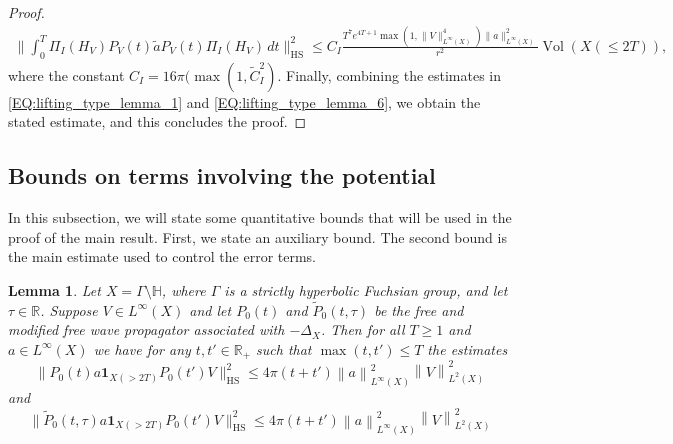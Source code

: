\documentclass[11pt,twoside,reqno]{amsart}
\newcommand{\R}{\mathbb{R}}
\newcommand{\bH}{\mathbb{H}}
\newcommand{\1}{\mathrm{\mathbf{1}}}
\newcommand{\bHS}{\mathrm{HS}}
\DeclareMathOperator{\Vol}{Vol}
\newcommand{\norm}[1]{\left\lVert#1\right\rVert}
\numberwithin{equation}{section}
\theoremstyle{plain}
\newtheorem{lemma}[thm]{Lemma}
\theoremstyle{definition}
\theoremstyle{remark}
\begin{document}
\begin{proof}
    \begin{equation}\label{EQ:lifting_type_lemma_6}
    \begin{aligned}
        \Big\lVert \int_0^T \Pi_I(H_V)P_V(t) \tilde{a} P_V(t)\Pi_I(H_V) \,  d t  \Big\rVert_{\bHS}^2 
        \leq C_I \frac{ T^7 e^{4T+1}\max(1, \lVert V\rVert_{L^\infty(X)}^4) \lVert a \rVert^2_{L^\infty(X)}}{r^2} \Vol(X(\leq2T)),
    \end{aligned} 
    \end{equation}
    where the constant $C_I = 16 \pi (\max(1,\tilde{C}_I^2)$. Finally, combining the estimates in \eqref{EQ:lifting_type_lemma_1} and \eqref{EQ:lifting_type_lemma_6}, we obtain the stated estimate, and this concludes the proof.
\end{proof}

\subsection{Bounds on terms involving the potential}

In this subsection, we will state some quantitative bounds that will be used in the proof of the main result. First, we state an auxiliary bound. The second bound is the main estimate used to control the error terms.


\begin{lemma}\label{LE:Potential_restriction_1}
Let $X=\Gamma\setminus \bH$, where $\Gamma$ is a strictly hyperbolic Fuchsian group, and let $\tau\in\R$. Suppose $V\in L^\infty(X)$ and let $P_0(t)$ and $\widetilde{P}_0(t,\tau)$ be the free and modified free wave propagator associated with $-\Delta_X$. Then for all $T\geq 1$ and $a\in L^\infty(X)$ we have for any $t,t'\in \R_{+}$ such that $\max(t,t')\leq T$ the estimates
%
\begin{equation*}
       \big\lVert  P_0(t) a \boldsymbol{1}_{X( > 2T)} P_0(t') V  \big\rVert_{\bHS}^2 \leq  4\pi (t+t') \norm{a}_{L^\infty(X)}^2 \norm{V}_{L^2(X)}^2
\end{equation*}
and
\begin{equation*}
       \big\lVert  \widetilde{P}_0(t,\tau) a \boldsymbol{1}_{X( > 2T)} P_0(t') V  \big\rVert_{\bHS}^2 \leq  4\pi (t+t') \norm{a}_{L^\infty(X)}^2 \norm{V}_{L^2(X)}^2
\end{equation*}
\end{lemma}
\end{document}
